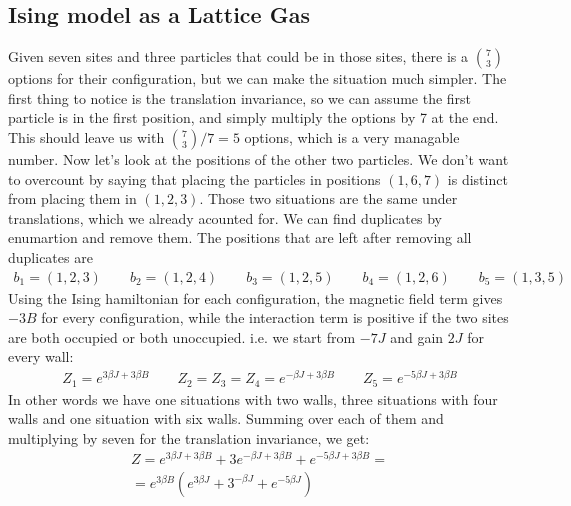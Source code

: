\documentclass{article}
\begin{document}
\subsection{Ising model as a Lattice Gas}
Given seven sites and three particles that could be in those sites, there is a $\binom{7}{3}$ options for their configuration, but we can make the situation much simpler. The first thing to notice is the translation invariance, so we can assume the first particle is in the first position, and simply multiply the options by 7 at the end. This should leave us with $\binom{7}{3} / 7 = 5$ options, which is a very managable number. Now let's look at the positions of the other two particles. We don't want to overcount by saying that placing the particles in positions $(1, 6, 7)$ is distinct from placing them in $(1,2,3)$. Those two situations are the same under translations, which we already acounted for. We can find duplicates by enumartion and remove them. The positions that are left after removing all duplicates are
\begin{equation}
\begin{gathered}
    b_1 = (1,2,3) \qquad b_2 = (1,2,4) \qquad b_3 = (1,2,5) \qquad b_4 = (1,2,6) \qquad b_5 = (1,3,5)
\end{gathered}
\end{equation}
Using the Ising hamiltonian for each configuration, the magnetic field term gives $-3B$ for every configuration, while the interaction term is positive if the two sites are both occupied or both unoccupied. i.e. we start from $-7J$ and gain $2J$ for every wall:
\begin{equation}
\begin{gathered}
    Z_1 = e^{3\beta J + 3\beta B} \qquad Z_2 = Z_3 = Z_4 = e^{-\beta J + 3\beta B} \qquad Z_5 = e^{-5\beta J + 3\beta B}
\end{gathered}
\end{equation}
In other words we have one situations with two walls, three situations with four walls and one situation with six walls. Summing over each of them and multiplying by seven for the translation invariance, we get:
\begin{equation}
\begin{gathered}
    Z = e^{3\beta J + 3\beta B} + 3e^{-\beta J + 3\beta B} + e^{-5\beta J + 3\beta B} = 
    \\
    = e^{3\beta B} \left(
        e^{3\beta J} + 3^{-\beta J} + e^{-5\beta J}
    \right)
\end{gathered}
\end{equation}
\end{document}
